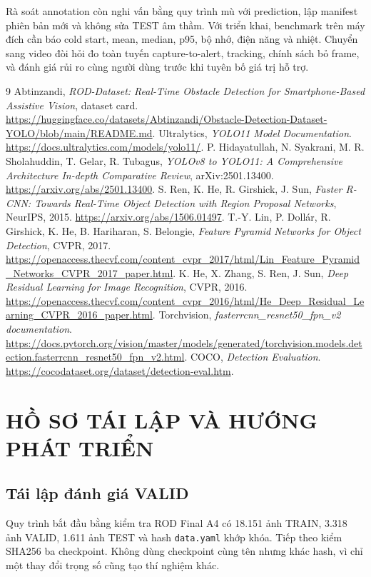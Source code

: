 \documentclass[12pt,a4paper,oneside]{report}
\begin{document}
Rà soát annotation còn nghi vấn bằng quy trình mù với prediction, lập manifest phiên bản mới và không sửa TEST âm thầm. Với triển khai, benchmark trên máy đích cần báo cold start, mean, median, p95, bộ nhớ, điện năng và nhiệt. Chuyển sang video đòi hỏi đo toàn tuyến capture-to-alert, tracking, chính sách bỏ frame, và đánh giá rủi ro cùng người dùng trước khi tuyên bố giá trị hỗ trợ.
\begin{thebibliography}{9}
 Abtinzandi, \textit{ROD-Dataset: Real-Time Obstacle Detection for Smartphone-Based Assistive Vision}, dataset card. \url{https://huggingface.co/datasets/Abtinzandi/Obstacle-Detection-Dataset-YOLO/blob/main/README.md}.
 Ultralytics, \textit{YOLO11 Model Documentation}. \url{https://docs.ultralytics.com/models/yolo11/}.
 P. Hidayatullah, N. Syakrani, M. R. Sholahuddin, T. Gelar, R. Tubagus, \textit{YOLOv8 to YOLO11: A Comprehensive Architecture In-depth Comparative Review}, arXiv:2501.13400. \url{https://arxiv.org/abs/2501.13400}.
 S. Ren, K. He, R. Girshick, J. Sun, \textit{Faster R-CNN: Towards Real-Time Object Detection with Region Proposal Networks}, NeurIPS, 2015. \url{https://arxiv.org/abs/1506.01497}.
 T.-Y. Lin, P. Dollár, R. Girshick, K. He, B. Hariharan, S. Belongie, \textit{Feature Pyramid Networks for Object Detection}, CVPR, 2017. \url{https://openaccess.thecvf.com/content_cvpr_2017/html/Lin_Feature_Pyramid_Networks_CVPR_2017_paper.html}.
 K. He, X. Zhang, S. Ren, J. Sun, \textit{Deep Residual Learning for Image Recognition}, CVPR, 2016. \url{https://openaccess.thecvf.com/content_cvpr_2016/html/He_Deep_Residual_Learning_CVPR_2016_paper.html}.
 Torchvision, \textit{fasterrcnn\_resnet50\_fpn\_v2 documentation}. \url{https://docs.pytorch.org/vision/master/models/generated/torchvision.models.detection.fasterrcnn_resnet50_fpn_v2.html}.
 COCO, \textit{Detection Evaluation}. \url{https://cocodataset.org/dataset/detection-eval.htm}.
\end{thebibliography}

\appendix
\chapter{HỒ SƠ TÁI LẬP VÀ HƯỚNG PHÁT TRIỂN}
\section{Tái lập đánh giá VALID}
Quy trình bắt đầu bằng kiểm tra ROD Final A4 có 18.151 ảnh TRAIN, 3.318 ảnh VALID, 1.611 ảnh TEST và hash \texttt{data.yaml} khớp khóa. Tiếp theo kiểm SHA256 ba checkpoint. Không dùng checkpoint cùng tên nhưng khác hash, vì chỉ một thay đổi trọng số cũng tạo thí nghiệm khác.
\end{document}
